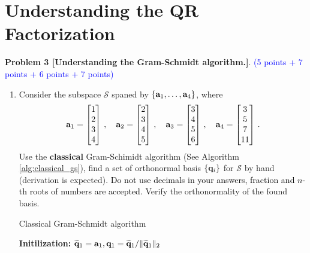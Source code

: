 \documentclass[english,onecolumn]{IEEEtran}
\begin{document}
\section{Understanding the QR Factorization}
\noindent\textbf{Problem 3 [Understanding the Gram-Schmidt algorithm.]}. \textcolor{blue}{(5 points + 7 points + 6 points + 7 points)}
\begin{enumerate}
	\item 
	Consider the subspace $\mathcal{S}$ spaned by $\{ {\bf a}_1,\ldots, {\bf a}_4\}$, where
	\[
	{\bf a}_1 = \begin{bmatrix} 1 \\ 2 \\ 3 \\ 4\end{bmatrix}\,,\quad 
	{\bf a}_2 =  \begin{bmatrix}2 \\ 3 \\ 4 \\ 5 \end{bmatrix}\,,\quad 
	{\bf a}_3 =  \begin{bmatrix}3 \\ 4 \\5 \\ 6 \end{bmatrix}\,,\quad
	{\bf a}_4 =  \begin{bmatrix}3 \\ 5 \\7 \\ 11 \end{bmatrix}\,.
	\] 
	Use the \textbf{classical} Gram-Schimidt algorithm (See Algorithm \ref{alg:classical_gs}), find a set of orthonormal basis $\{{\bf q}_i\}$ for $\mathcal{S}$ by hand (derivation is expected). \textcolor{black}{
	Do not use decimals in your answers, fraction and $n$-th roots of numbers are accepted.}
	Verify the orthonormality of the found basis.
	\begin{algorithm}[htbp]
 \label{alg:classical_gs}
\caption{Classical Gram-Schmidt algorithm}
\SetAlgoLined
{}
\textbf{Initilization:} $\widetilde{{\bf q}}_1 = {\bf a}_1, {\bf q}_1 = \widetilde{{\bf q}}_1/\|\widetilde{{\bf q}}_1\|_2$\\
\end{algorithm}
\end{enumerate}
\end{document}
